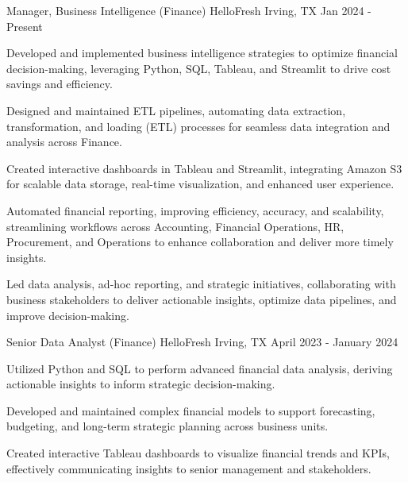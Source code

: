

\begin{cventries}

\cventry
  {Manager, Business Intelligence (Finance)} %
  {HelloFresh} %
  {Irving, TX} %
  {Jan 2024 - Present} %
  {
    \begin{cvitems} %
      \item {Developed and implemented business intelligence strategies to optimize financial decision-making, leveraging Python, SQL, Tableau, and Streamlit to drive cost savings and efficiency.}
      \item {Designed and maintained ETL pipelines, automating data extraction, transformation, and loading (ETL) processes for seamless data integration and analysis across Finance.}
      \item {Created interactive dashboards in Tableau and Streamlit, integrating Amazon S3 for scalable data storage, real-time visualization, and enhanced user experience.}
      \item {Automated financial reporting, improving efficiency, accuracy, and scalability, streamlining workflows across Accounting, Financial Operations, HR, Procurement, and Operations to enhance collaboration and deliver more timely insights.}
      \item {Led data analysis, ad-hoc reporting, and strategic initiatives, collaborating with business stakeholders to deliver actionable insights, optimize data pipelines, and improve decision-making.}
    \end{cvitems}
  }

\cventry
  {Senior Data Analyst (Finance)} %
  {HelloFresh} %
  {Irving, TX} %
  {April 2023 - January 2024} %
  {
    \begin{cvitems} %
      \item {Utilized Python and SQL to perform advanced financial data analysis, deriving actionable insights to inform strategic decision-making.}
      \item {Developed and maintained complex financial models to support forecasting, budgeting, and long-term strategic planning across business units.}
      \item {Created interactive Tableau dashboards to visualize financial trends and KPIs, effectively communicating insights to senior management and stakeholders.}
    \end{cvitems}
  }


\end{cventries}
